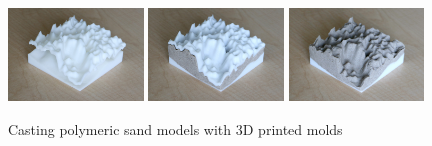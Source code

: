 \documentclass[prodmode,acmtochi]{acmsmall} %
\begin{document}
\begin{figure}[h!]
\begin{center}
		\includegraphics[width=0.32\textwidth]{images/3d_print/3d_print_1.jpg}
		\includegraphics[width=0.32\textwidth]{images/3d_print/3d_print_2.jpg}
		\includegraphics[width=0.32\textwidth]{images/3d_print/3d_print_3.jpg}
	\caption{Casting polymeric sand models with 3D printed molds}
	\label{fig:casting}
\end{center}
\end{figure}
\end{document}
